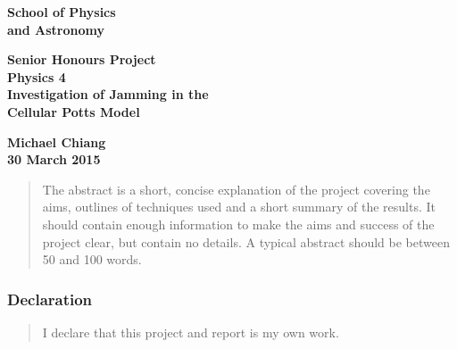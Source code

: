 \documentclass[a4paper,12pt]{article}
\begin{document}
\pagestyle{empty}                       %
\epsfxsize=40mm                         %
\begin{minipage}[b]{110mm}
        {\Huge\bf School of Physics\\ and Astronomy
        \vspace*{17mm}}
\end{minipage}
\hfill
\begin{minipage}[t]{40mm}               
\end{minipage}
\par\noindent                                           %
\vspace*{2cm}
\begin{center}
        \Large\bf \Large\bf Senior Honours Project\\
        \Large\bf Physics 4\\[10pt]                     %
        \LARGE\bf Investigation of Jamming in the\\ Cellular Potts Model       %
\end{center}
\vspace*{0.5cm}
\begin{center}
        \bf Michael Chiang\\                           %
        30 March 2015                                    %
\end{center}
\vspace*{5mm}
%
%                       
\begin{abstract}
        The abstract is a short, concise explanation of the project
        covering the aims, outlines of techniques used and a short
        summary of the results. It should contain enough information to
        make the aims and success of the project clear, but contain no details.
        A typical abstract should be between 50 and 100 words.
\end{abstract}

\vspace*{1cm}

\subsubsection*{Declaration}

\begin{quotation}
        I declare that this project and report is my own work.
\end{quotation}
\end{document}

